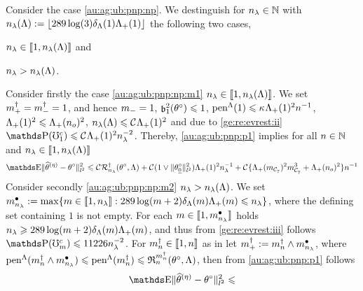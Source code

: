 \begin{pro}
  Consider the case \ref{au:ag:ub:pnp:np}. We destinguish for $\ssE\in\Nz$ with
 $\ssE(\Lambda):=\floor{289\log(3)\cmiSv[1]\miSv[1]}$
the following two
cases, \begin{inparaenum}[i]\renewcommand{\theenumi}{\dgrau\rm(\alph{enumi})}\item\label{au:ag:ub:pnp:np:m1}
$\ssE\in\nset{1,\ssE(\Lambda)}$ and \item\label{au:ag:ub:pnp:np:m2}
$\ssE>\ssE(\Lambda)$. \end{inparaenum}
Consider firstly the case \ref{au:ag:ub:pnp:np:m1}
$\ssE\in\nset{1,\ssE(\Lambda)}$. We set $\pdDi=\mdDi=1$, and hence
$\mDi=1$, $\bias[1]^2(\xdf)\leq1$,
$\penSv[1]\leq\cpen\miSv[1]^2\ssY^{-1}$, $\miSv[1]^2\leq \miSv[\ssY_{o}]^2$, $\ssE(\Lambda)\leq \cst{}\miSv[1]^2$ and due to
 \ref{ge:re:evrest:ii} $\P(\aixEv[1]^c)\leq
\cst{}\miSv[1]^2\ssE^{-2}$. Thereby, 
 \eqref{au:ag:ub:pnp:p1} implies for all $\ssY\in\Nz$ and $\ssE\in\nset{1,\ssE(\Lambda)}$
 \begin{multline}\label{au:ag:ub:pnp:p10}
   \E\Vnormlp{\widehat{\theta}^{(\eta)}-\xdf}^2\leq
   \cst{}\mRa{\xdf,\Lambda}
    + \cst{}(1\vee\Vnormlp{\xdf_{\underline{0}}}^2)\miSv[1]^2\ssE^{-1}  
    +\cst{}\{\miSv[\Di_{\cst{7}}]^2\Di_{\cst{7}}^3+\miSv[\ssY_{o}]^2\}\ssY^{-1}
  \end{multline}
Consider secondly \ref{au:ag:ub:pnp:np:m2}
$\ssE>\ssE(\Lambda)$.  We set  
$\sDi{\ssE}:=\max\{\Di\in\nset{1,\ssE}:289\log(\Di+2)\cmiSv[\Di]\miSv[\Di]\leq\ssE\}$, where the defining set containing $1$ is not
empty. For each
$\Di\in\nset{1,\sDi{\ssE}}$ holds 
$\ssE\geq289\log(\Di+2)\cmiSv\miSv$, and thus from
 \ref{ge:re:evrest:iii} follows
$\P(\aixEv[\Di]^c)\leq 11226\ssE^{-2}$. For $\aDi{\ssY}\in\nset{1,n}$
as in  let
$\pdDi:=\aDi{\ssY}\wedge\sDi{\ssE}$, where
$\penSv[\aDi{\ssY}\wedge\sDi{\ssE}]\leq\penSv[\aDi{\ssY}]\leq \daRa{\aDi{\ssY}}{(\xdf,\Lambda)}$, then from \eqref{au:ag:ub:pnp:p1} follows
 \begin{multline}\label{au:ag:ub:pnp:p11}
   \E\Vnormlp{\widehat{\theta}^{(\eta)}-\xdf}^2\leq

\end{multline}
\end{pro}
